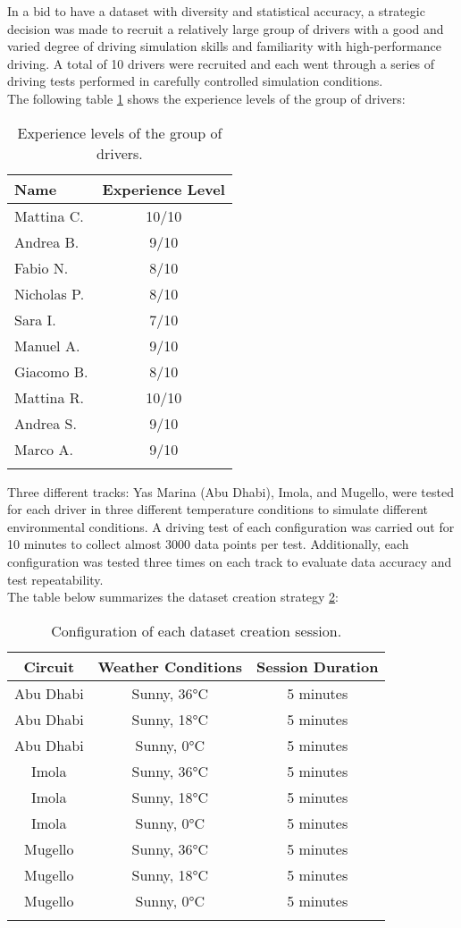 \documentclass[a4paper,final,12pt]{report}
\begin{document}
In a bid to have a dataset with diversity and statistical accuracy, a strategic decision was made to recruit a relatively large group of drivers with a good and varied degree of driving simulation skills and familiarity with high-performance driving. A total of 10 drivers were recruited and each went through a series of driving tests performed in carefully controlled simulation conditions.\\

The following table \ref{tab:driver_experience} shows the experience levels of the group of drivers:

\begin{longtable}{|l|c|}
\hline
\textbf{Name} & \textbf{Experience Level} \\
\hline
Mattina C. & 10/10 \\
Andrea B. & 9/10 \\
Fabio N. & 8/10 \\
Nicholas P. & 8/10 \\
Sara I. & 7/10 \\
Manuel A. & 9/10 \\
Giacomo B. & 8/10 \\
Mattina R. & 10/10 \\
Andrea S. & 9/10 \\
Marco A. & 9/10 \\
\hline
\caption{Experience levels of the group of drivers.}
\label{tab:driver_experience}
\end{longtable}


Three different tracks: Yas Marina (Abu Dhabi), Imola, and Mugello, were tested for each driver in three different temperature conditions to simulate different environmental conditions. A driving test of each configuration was carried out for 10 minutes to collect almost 3000 data points per test. Additionally, each configuration was tested three times on each track to evaluate data accuracy and test repeatability.\\

The table below summarizes the dataset creation strategy \ref{tab:dataset_config}:

\begin{longtable}{|c|c|c|}
\hline
\textbf{Circuit} & \textbf{Weather Conditions} & \textbf{Session Duration} \\
\hline
Abu Dhabi & Sunny, 36°C & 5 minutes \\
Abu Dhabi & Sunny, 18°C & 5 minutes \\
Abu Dhabi & Sunny, 0°C  & 5 minutes \\
\hline
Imola & Sunny, 36°C & 5 minutes \\
Imola & Sunny, 18°C & 5 minutes \\
Imola & Sunny, 0°C  & 5 minutes \\
\hline
Mugello & Sunny, 36°C & 5 minutes \\
Mugello & Sunny, 18°C & 5 minutes \\
Mugello & Sunny, 0°C  & 5 minutes \\
\hline
\caption{Configuration of each dataset creation session.}
\label{tab:dataset_config}
\end{longtable}
\end{document}
